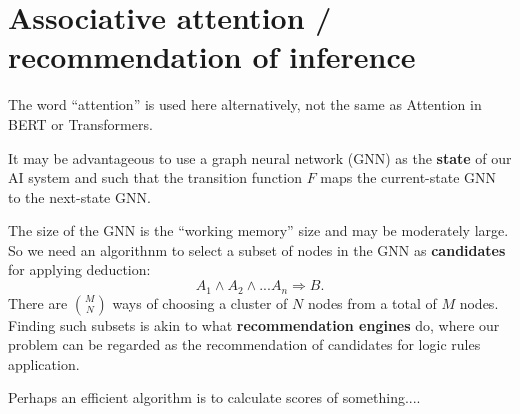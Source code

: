 

\section{Associative attention / recommendation of inference}

The word ``attention'' is used here alternatively, not the same as Attention in BERT or Transformers.

It may be advantageous to use a graph neural network (GNN) as the \textbf{state} of our AI system and such that the transition function $F$ maps the current-state GNN to the next-state GNN.

The size of the GNN is the ``working memory'' size and may be moderately large.  So we need an algorithnm to select a subset of nodes in the GNN as \textbf{candidates} for applying deduction:
\begin{equation}
A_1 \wedge A_2 \wedge ... A_n \Rightarrow B .
\end{equation}
There are $M \choose N$ ways of choosing a cluster of $N$ nodes from a total of $M$ nodes.  Finding such subsets is akin to what \textbf{recommendation engines} do, where our problem can be regarded as the recommendation of candidates for logic rules application.

Perhaps an efficient algorithm is to calculate scores of something....
